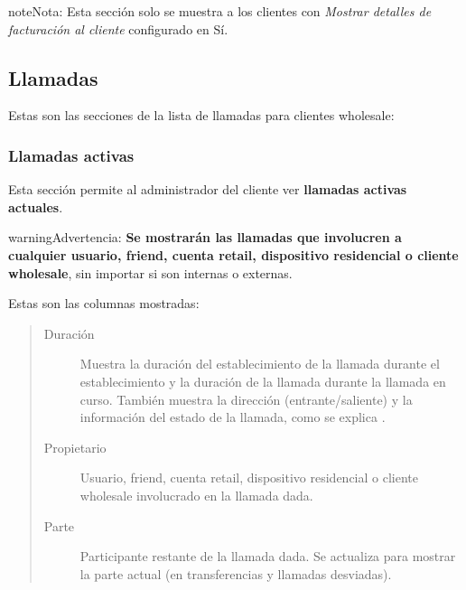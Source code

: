 \documentclass[letterpaper,10pt,spanish]{sphinxmanual}
\begin{document}
\begin{notice}{note}{Nota:}
Esta sección solo se muestra a los clientes con \emph{Mostrar detalles de facturación al cliente} configurado en Sí.
\end{notice}


\subsection{Llamadas}
\label{administration_portal/client/wholesale/calls/index::doc}\label{administration_portal/client/wholesale/calls/index:calls}
Estas son las secciones de la lista de llamadas para clientes wholesale:


\subsubsection{Llamadas activas}
\label{administration_portal/client/wholesale/calls/active_calls::doc}\label{administration_portal/client/wholesale/calls/active_calls:active-calls}
Esta sección permite al administrador del cliente ver \textbf{llamadas activas actuales}.

\begin{notice}{warning}{Advertencia:}
\textbf{Se mostrarán las llamadas que involucren a cualquier usuario, friend, cuenta retail, dispositivo residencial o cliente wholesale}, sin importar si son internas o externas.
\end{notice}

Estas son las columnas mostradas:
\begin{quote}
\begin{description}
\item[{Duración}] \leavevmode
Muestra la duración del establecimiento de la llamada durante el establecimiento y la duración de la llamada durante la llamada en curso. También muestra la dirección (entrante/saliente) y la información del estado de la llamada, como se explica {\hyperref[administration_portal/platform/active_calls:call\string-state]{}}.

\item[{Propietario}] \leavevmode
Usuario, friend, cuenta retail, dispositivo residencial o cliente wholesale involucrado en la llamada dada.

\item[{Parte}] \leavevmode
Participante restante de la llamada dada. Se actualiza para mostrar la parte actual (en transferencias y llamadas desviadas).

\end{description}
\end{quote}
\end{document}
